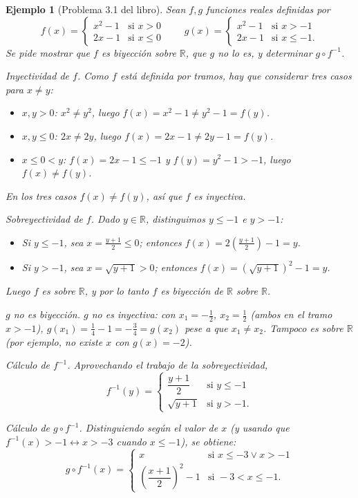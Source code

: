\documentclass[11pt]{article}
\newtheorem*{ejemplo}{Ejemplo}
\begin{document}
\begin{ejemplo}[Problema 3.1 del libro]
Sean $f,g$ funciones reales definidas por
\[
f(x) = \begin{cases} x^2-1 & \text{si } x>0 \\ 2x-1 & \text{si } x \le 0 \end{cases}
\qquad
g(x) = \begin{cases} x^2-1 & \text{si } x>-1 \\ 2x-1 & \text{si } x \le -1. \end{cases}
\]
Se pide mostrar que $f$ es biyección sobre $\mathbb{R}$, que $g$ no lo es, y
determinar $g \circ f^{-1}$.

\emph{Inyectividad de $f$.} Como $f$ está definida por tramos, hay que
considerar tres casos para $x \neq y$:
\begin{itemize}
\item $x,y>0$: $x^2 \neq y^2$, luego $f(x) = x^2-1 \neq y^2-1 = f(y)$.
\item $x,y\le 0$: $2x \neq 2y$, luego $f(x) = 2x-1 \neq 2y-1 = f(y)$.
\item $x\le 0 < y$: $f(x) = 2x-1 \le -1$ y $f(y) = y^2-1 > -1$, luego $f(x)\neq f(y)$.
\end{itemize}
En los tres casos $f(x)\neq f(y)$, así que $f$ es inyectiva.

\emph{Sobreyectividad de $f$.} Dado $y\in\mathbb{R}$, distinguimos $y\le -1$ e
$y>-1$:
\begin{itemize}
\item Si $y \le -1$, sea $x = \frac{y+1}{2} \le 0$; entonces $f(x) = 2\left(\frac{y+1}{2}\right)-1 = y$.
\item Si $y > -1$, sea $x = \sqrt{y+1} > 0$; entonces $f(x) = (\sqrt{y+1})^2-1 = y$.
\end{itemize}
Luego $f$ es sobre $\mathbb{R}$, y por lo tanto $f$ es biyección de $\mathbb{R}$
sobre $\mathbb{R}$.

\emph{$g$ no es biyección.} $g$ no es inyectiva: con $x_1=-\frac12$, $x_2=\frac12$
(ambos en el tramo $x>-1$), $g(x_1) = \frac14-1 = -\frac34 = g(x_2)$ pese a que
$x_1\neq x_2$. Tampoco es sobre $\mathbb{R}$ (por ejemplo, no existe $x$ con
$g(x)=-2$).

\emph{Cálculo de $f^{-1}$.} Aprovechando el trabajo de la sobreyectividad,
\[
f^{-1}(y) = \begin{cases} \dfrac{y+1}{2} & \text{si } y \le -1 \\[4pt] \sqrt{y+1} & \text{si } y > -1. \end{cases}
\]

\emph{Cálculo de $g\circ f^{-1}$.} Distinguiendo según el valor de $x$ (y
usando que $f^{-1}(x) > -1 \leftrightarrow x > -3$ cuando $x \le -1$), se
obtiene:
\[
g\circ f^{-1}(x) = \begin{cases} x & \text{si } x \le -3 \lor x > -1 \\[4pt] \left(\dfrac{x+1}{2}\right)^2-1 & \text{si } -3 < x \le -1. \end{cases}
\]
\end{ejemplo}
\end{document}

